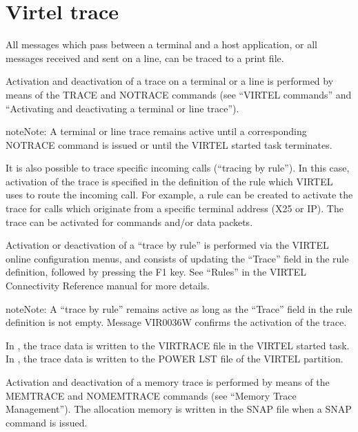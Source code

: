 \documentclass[letterpaper,10pt,english]{sphinxmanual}
\begin{document}
\section{Virtel trace}
\label{\detokenize{audit_operations_ and_performance:virtel-trace}}\label{\detokenize{audit_operations_ and_performance:index-78}}
\sphinxAtStartPar
All messages which pass between a terminal and a host application, or all messages received and sent on a line, can be traced to a print file.

\sphinxAtStartPar
Activation and deactivation of a trace on a terminal or a line is performed by means of the TRACE and NOTRACE commands (see “VIRTEL commands” and “Activating and deactivating a terminal or line trace”).

\begin{sphinxadmonition}{note}{Note:}
\sphinxAtStartPar
A terminal or line trace remains active until a corresponding NOTRACE command is issued or until the VIRTEL started task terminates.
\end{sphinxadmonition}

\sphinxAtStartPar
It is also possible to trace specific incoming calls (“tracing by rule”). In this case, activation of the trace is specified in the definition of the rule which VIRTEL uses to route the incoming call. For example, a rule can be created to activate the trace for calls which originate from a specific terminal address (X25 or IP). The trace can be activated for commands and/or data packets.

\sphinxAtStartPar
Activation or deactivation of a “trace by rule” is performed via the VIRTEL on\sphinxhyphen{}line configuration menus, and consists of updating the “Trace” field in the rule definition, followed by pressing the F1 key. See “Rules” in the VIRTEL Connectivity Reference manual for more details.

\begin{sphinxadmonition}{note}{Note:}
\sphinxAtStartPar
A “trace by rule” remains active as long as the “Trace” field in the rule definition is not empty. Message VIR0036W confirms the activation of the trace.
\end{sphinxadmonition}

\sphinxAtStartPar
In , the trace data is written to the VIRTRACE file in the VIRTEL started task.
In , the trace data is written to the POWER LST file of the VIRTEL partition.

\sphinxAtStartPar
Activation and deactivation of a memory trace is performed by means of the MEMTRACE and NOMEMTRACE commands (see “Memory Trace Management”). The allocation memory is written in the SNAP file when a SNAP command is issued.
\end{document}
